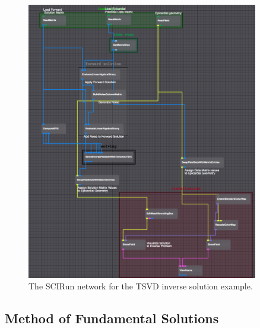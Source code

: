     \begin{figure}
        \begin{center}
        \includegraphics[width=0.9\textwidth]{ECGToolkitGuide_figures/TSVDNetwork.png}
        \caption{The SCIRun network for the TSVD inverse solution example.}
        \label{fig:TSVDNetworkExample}
        \end{center}
    \end{figure}




    
    
   
\subsection{Method of Fundamental Solutions}

